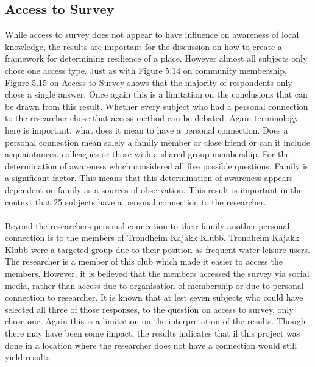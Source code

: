 \paragraph{}

\subsection{Access to Survey}
While access to survey does not appear to have influence on awareness of local knowledge, the results are important for the discussion on how to create a framework for determining resilience of a place. However almost all subjects only chose one access type. Just as with Figure 5.14 on community membership, Figure 5.15 on Access to Survey shows that the majority of respondents only chose a single answer. Once again this is a limitation on the conclusions that can be drawn from this result. Whether every subject who had a personal connection to the researcher chose that access method can be debated. Again terminology here is important, what does it mean to have a personal connection. Does a personal connection mean solely a family member or close friend or can it include acquaintances, colleagues or those with a shared group membership.  For the determination of awareness which considered all five possible questions, Family is a significant factor. This means that this determination of awareness appears dependent on family as a sources of observation. This result is important in the context that 25 subjects have a personal connection to the researcher.
\paragraph{}
Beyond the researchers personal connection to their family another personal connection is to the members of Trondheim Kajakk Klubb. Trondheim Kajakk Klubb were a targeted group due to their position as frequent water leisure users. The researcher is a member of this club which made it easier to access the members. However, it is believed that the members accessed the survey via social media, rather than access due to organisation of membership or due to personal connection to researcher. It is known that at lest seven subjects who could have selected all three of those responses, to the question on access to survey, only chose one. Again this is a limitation on the interpretation of the results. Though there may have been some impact, the results indicates that if this project was done in a location where the researcher does not have a connection would still yield results.
